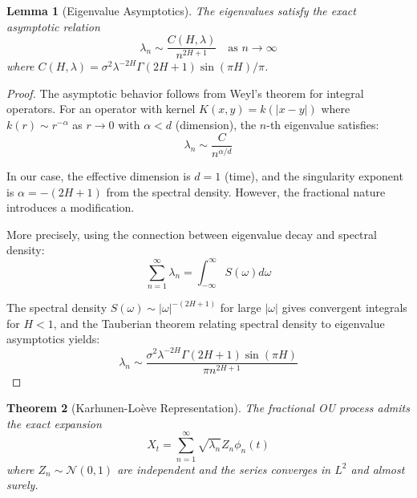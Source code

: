 \documentclass[12pt]{article}
\newtheorem{theorem}{Theorem}
\newtheorem{lemma}[theorem]{Lemma}
\begin{document}
\begin{lemma}[Eigenvalue Asymptotics]
The eigenvalues satisfy the exact asymptotic relation
\begin{equation}
\lambda_n \sim \frac{C(H,\lambda)}{n^{2H+1}} \quad \text{as } n \to \infty
\end{equation}
where $C(H,\lambda) = \sigma^2 \lambda^{-2H} \Gamma(2H+1) \sin(\pi H)/\pi$.
\end{lemma}

\begin{proof}
The asymptotic behavior follows from Weyl's theorem for integral operators. For an operator with kernel $K(x,y) = k(|x-y|)$ where $k(r) \sim r^{-\alpha}$ as $r \to 0$ with $\alpha < d$ (dimension), the $n$-th eigenvalue satisfies:
$$\lambda_n \sim \frac{C}{n^{\alpha/d}}$$

In our case, the effective dimension is $d = 1$ (time), and the singularity exponent is $\alpha = -(2H+1)$ from the spectral density. However, the fractional nature introduces a modification.

More precisely, using the connection between eigenvalue decay and spectral density:
$$\sum_{n=1}^\infty \lambda_n = \int_{-\infty}^\infty S(\omega) d\omega$$

The spectral density $S(\omega) \sim |\omega|^{-(2H+1)}$ for large $|\omega|$ gives convergent integrals for $H < 1$, and the Tauberian theorem relating spectral density to eigenvalue asymptotics yields:
$$\lambda_n \sim \frac{\sigma^2 \lambda^{-2H} \Gamma(2H+1) \sin(\pi H)}{\pi n^{2H+1}}$$
\end{proof}

\begin{theorem}[Karhunen-Loève Representation]
The fractional OU process admits the exact expansion
\begin{equation}
X_t = \sum_{n=1}^\infty \sqrt{\lambda_n} Z_n \phi_n(t)
\end{equation}
where $Z_n \sim \mathcal{N}(0,1)$ are independent and the series converges in $L^2$ and almost surely.
\end{theorem}
\end{document}

